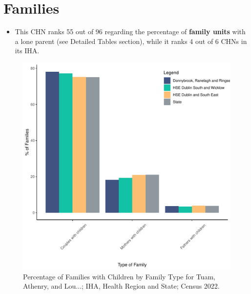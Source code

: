 \documentclass{article}
\begin{document}
\section{Families}\label{sect:Fam}
\begin{itemize}
\item This CHN ranks  55 out of 96 regarding the percentage of \textbf{family units} with a lone parent (see Detailed Tables section), while it ranks   4 out of 6 CHNs in its IHA.
\end{itemize}
\begin{figure}[H]
	\centering
	\includegraphics[width = 150mm]{../figures/FamED.pdf}
	\caption{Percentage of Families with Children by Family Type for Tuam, Athenry, and Lou...; IHA, Health Region and State; Census 2022.}
	\label{fig:vbnv}
	\end{figure}
	
\end{document}
